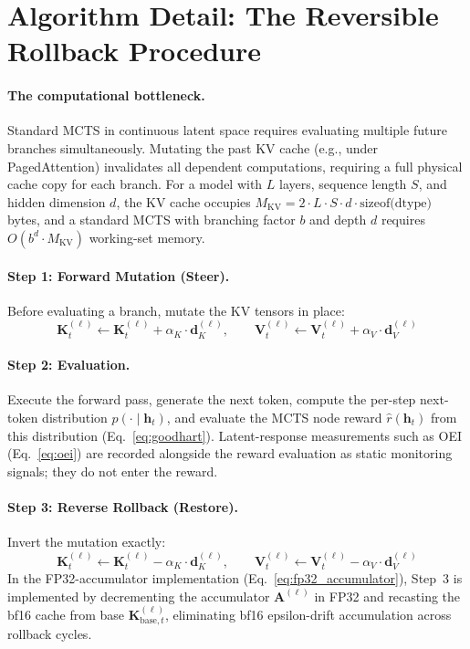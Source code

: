 \section{Algorithm Detail: The Reversible Rollback Procedure}\label{sec:appendix-algorithm}

\paragraph{The computational bottleneck.} Standard MCTS in continuous latent space requires evaluating multiple future branches simultaneously. Mutating the past KV cache (e.g., under PagedAttention) invalidates all dependent computations, requiring a full physical cache copy for each branch. For a model with $L$ layers, sequence length $S$, and hidden dimension $d$, the KV cache occupies $M_{\text{KV}} = 2 \cdot L \cdot S \cdot d \cdot \text{sizeof(dtype)}$ bytes, and a standard MCTS with branching factor $b$ and depth $d$ requires $O(b^d \cdot M_{\text{KV}})$ working-set memory.

\paragraph{Step 1: Forward Mutation (Steer).} Before evaluating a branch, mutate the KV tensors in place:
\begin{equation}
\mathbf{K}_t^{(\ell)} \leftarrow \mathbf{K}_t^{(\ell)} + \alpha_K \cdot \mathbf{d}_K^{(\ell)}, \qquad \mathbf{V}_t^{(\ell)} \leftarrow \mathbf{V}_t^{(\ell)} + \alpha_V \cdot \mathbf{d}_V^{(\ell)}
\label{eq:forward_mutation}
\end{equation}

\paragraph{Step 2: Evaluation.} Execute the forward pass, generate the next token, compute the per-step next-token distribution $p(\cdot \mid \mathbf{h}_t)$, and evaluate the MCTS node reward $\hat{r}(\mathbf{h}_t)$ from this distribution (Eq.~\ref{eq:goodhart}). Latent-response measurements such as OEI (Eq.~\ref{eq:oei}) are recorded alongside the reward evaluation as static monitoring signals; they do not enter the reward.

\paragraph{Step 3: Reverse Rollback (Restore).} Invert the mutation exactly:
\begin{equation}
\mathbf{K}_t^{(\ell)} \leftarrow \mathbf{K}_t^{(\ell)} - \alpha_K \cdot \mathbf{d}_K^{(\ell)}, \qquad \mathbf{V}_t^{(\ell)} \leftarrow \mathbf{V}_t^{(\ell)} - \alpha_V \cdot \mathbf{d}_V^{(\ell)}
\label{eq:reverse_rollback}
\end{equation}
In the FP32-accumulator implementation (Eq.~\ref{eq:fp32_accumulator}), Step~3 is implemented by decrementing the accumulator $\mathbf{A}^{(\ell)}$ in FP32 and recasting the bf16 cache from base $\mathbf{K}_{\text{base},t}^{(\ell)}$, eliminating bf16 epsilon-drift accumulation across rollback cycles.

